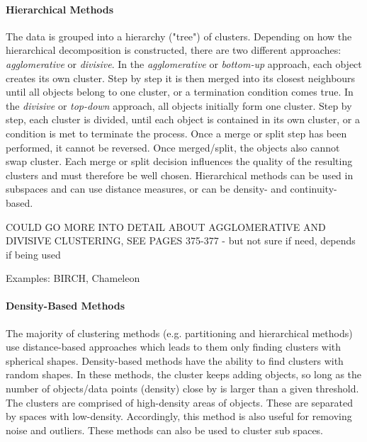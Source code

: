   \paragraph{Hierarchical Methods}
  The data is grouped into a hierarchy ("tree") of clusters. Depending on how the hierarchical decomposition is constructed, there are two different approaches: \textit{agglomerative} or \textit{divisive}. In the \textit{agglomerative} or \textit{bottom-up} approach, each object creates its own cluster. Step by step it is then merged into its closest neighbours until all objects belong to one cluster, or a termination condition comes true. In the \textit{divisive} or \textit{top-down} approach, all objects initially form one cluster. Step by step, each cluster is divided, until each object is contained in its own cluster, or a condition is met to terminate the process. Once a merge or split step has been performed, it cannot be reversed. Once merged/split, the objects also cannot swap cluster. Each merge or split decision influences the quality of the resulting clusters and must therefore be well chosen. Hierarchical methods can be used in subspaces and can use distance measures, or can be density- and continuity-based.

  COULD GO MORE INTO DETAIL ABOUT AGGLOMERATIVE AND DIVISIVE CLUSTERING, SEE PAGES 375-377 - but not sure if need, depends if being used

  Examples: BIRCH, Chameleon
  

  \paragraph{Density-Based Methods}
  The majority of clustering methods (e.g. partitioning and hierarchical methods) use distance-based approaches which leads to them only finding clusters with spherical shapes. Density-based methods have the ability to find clusters with random shapes. In these methods, the cluster keeps adding objects, so long as the number of objects/data points (density) close by is larger than a given threshold. The clusters are comprised of high-density areas of objects. These are separated by spaces with low-density. Accordingly, this method is also useful for removing noise and outliers.
  These methods can also be used to cluster sub spaces.


